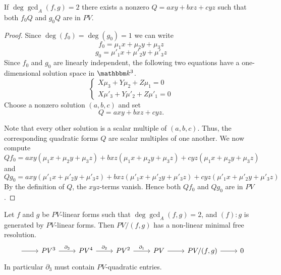 \begin{lem}\label{Q}
   If $\deg\gcd_A(f,g)=2$ there exists a nonzero $Q=axy+bxz+cyz$ such that both $f_0Q$ and $g_0Q$ are in $PV$.
\end{lem}

\begin{proof}
    Since $\deg(f_0)=\deg(g_0)= 1$ we can write
    \[f_0=\mu_1x+\mu_2y+\mu_3z\]
    \[g_0=\mu'_1x+\mu'_2y+\mu'_3z\]
    Since $f_0$ and $g_0$ are linearly independent, the following two equations have a one-dimensional solution space in $\K^3$. 
    \[
    \begin{cases}
      X\mu_3+Y\mu_2+Z\mu_1=0\\
      X\mu'_3+Y\mu'_2+Z\mu'_1=0
    \end{cases}
    \]
Choose a nonzero solution $(a,b,c)$ and set
          $$Q=a xy+b xz+c yz.$$
  
    Note that every other solution is a scalar multiple of $(a,b,c)$. Thus, the corresponding quadratic forms $Q$ are scalar multiples of one another. We now compute
        \[Qf_0=axy(\mu_1x+\mu_2y+\mu_3z)+bxz(\mu_1x+\mu_2y+\mu_3z)+cyz(\mu_1x+\mu_2y+\mu_3z)\]
and
        \[Qg_0=axy(\mu'_1x+\mu'_2y+\mu'_3z)+bxz(\mu'_1x+\mu'_2y+\mu'_3z)+cyz(\mu'_1x+\mu'_2y+\mu'_3z)\]
By the definition of $Q$, the $xyz$-terms vanish. Hence both $Qf_0$ and $Qg_0$ are in $PV$.
  
\end{proof}

\begin{lem}\label{deg2}
 Let $f$ and $g$ be $PV$-linear forms such that $\deg\gcd_A(f,g)=2$, and $(f):g$ is generated by $PV$-linear forms. Then $PV/(f,g)$ has a non-linear minimal free resolution.
 $$
\begin{tikzcd}
	{ }& PV^3 & PV^4 & PV^2 & PV & {PV/(f,g)} & 0
	\arrow[from=1-1, to=1-2]
	\arrow["{\partial_3}", from=1-2, to=1-3]
	\arrow["{\partial_2}", from=1-3, to=1-4]
	\arrow["{\partial_1}", from=1-4, to=1-5]
    \arrow [from= 1-5, to=1-6]
    \arrow [from= 1-6, to=1-7]
\end{tikzcd}
$$
In particular $\partial_3$ must contain $PV$-quadratic entries.
\end{lem}

